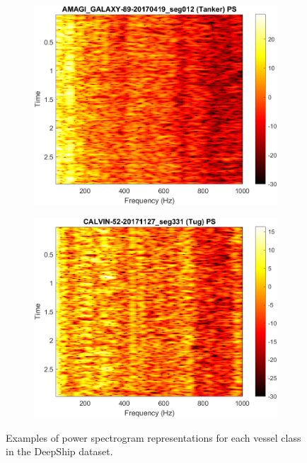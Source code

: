 \begin{figure}[p]
    \vspace{0.5cm} %

    \begin{subfigure}{0.49\textwidth}
        \centering
        \includegraphics[trim={0 0 1.3cm 0},clip,width=\linewidth]{img/ch3/power_spectrogram/Tanker.png}
    \end{subfigure}
    \begin{subfigure}{0.49\textwidth}
        \centering
        \includegraphics[trim={0 0 1.3cm 0},clip,width=\linewidth]{img/ch3/power_spectrogram/Tug.png}
    \end{subfigure}
    \caption{Examples of power spectrogram representations for each vessel class in the DeepShip dataset.}
    \label{fig:powerspectrogram-example}
\end{figure}

